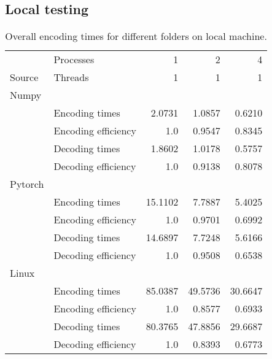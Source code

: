 \subsection{Local testing}
\begin{table}[!h]
	\centering
	\caption{Overall encoding times for different folders on local machine.}
	\begin{tabular}{llrrr}
		\toprule
		\diagbox{}{} & Processes &     1 &        2 &        4 \\
		Source & Threads &     1 &        1 &        1 \\
		\toprule
		Numpy & &  & \\
		\toprule
		& Encoding times &  2.0731 &  1.0857 &  0.6210 \\
		\midrule
		& Encoding efficiency &  1.0 &  0.9547 &  0.8345 \\
		\midrule
		& Decoding times & 1.8602 &  1.0178 &  0.5757 \\
		\midrule
		& Decoding efficiency &  1.0 &  0.9138 &  0.8078 \\
		\toprule
		Pytorch & &  & \\
		\toprule
		& Encoding times &  15.1102 &  7.7887 &  5.4025 \\
		\midrule
		& Encoding efficiency  &  1.0 &  0.9701 &  0.6992 \\
		\midrule
		& Decoding times  & 14.6897 &  7.7248 &  5.6166 \\
		\midrule
		& Decoding efficiency&  1.0 &  0.9508 &  0.6538 \\
		\toprule
		Linux & &  & \\
		\toprule
		& Encoding times &  85.0387 &  49.5736 &  30.6647 \\
		\midrule
		& Encoding efficiency &  1.0 &  0.8577 &  0.6933 \\
		\midrule
		& Decoding times&  80.3765 &  47.8856 &  29.6687 \\
		\midrule
		& Decoding efficiency&  1.0 &  0.8393 &  0.6773 \\
		\bottomrule
	\end{tabular}
\end{table}